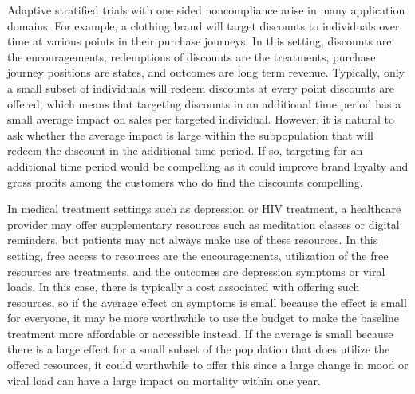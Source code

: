 Adaptive stratified trials with one sided noncompliance arise in many application domains.
For example, a clothing brand will target discounts to individuals over time at various points in their purchase journeys.
In this setting, discounts are the encouragements, redemptions of discounts are the treatments, purchase journey positions are states, and outcomes are long term revenue.
Typically, only a small subset of individuals will redeem discounts at every point discounts are offered, which means that targeting discounts in an additional time period has a small average impact on sales per targeted individual.
However, it is natural to ask whether the average impact is large within the subpopulation that will redeem the discount in the additional time period.
If so, targeting for an additional time period would be compelling as it could improve brand loyalty and gross profits among the customers who do find the discounts compelling.

In medical treatment settings such as depression or HIV treatment, a healthcare provider may offer supplementary resources such as meditation classes or digital reminders, but patients may not always make use of these resources.
In this setting, free access to resources are the encouragements, utilization of the free resources are treatments, and the outcomes are depression symptoms or viral loads.
In this case, there is typically a cost associated with offering such resources, so if the average effect on symptoms is small because the effect is small for everyone, it may be more worthwhile to use the budget to make the baseline treatment more affordable or accessible instead.
If the average is small because there is a large effect for a small subset of the population that does utilize the offered resources, it could worthwhile to offer this since a large change in mood or viral load can have a large impact on mortality within one year.

